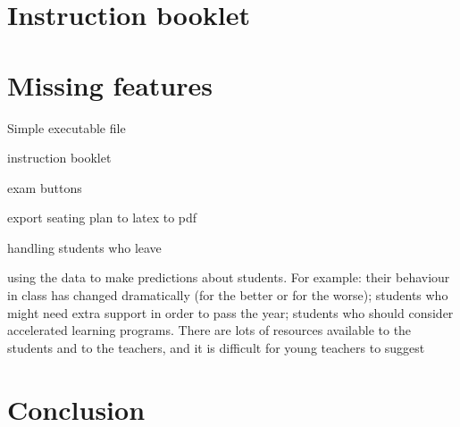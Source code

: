 \documentclass[10pt]{article}
\begin{document}
\section{Instruction booklet} \label{instructions}

\section{Missing features} \label{notdone}

Simple executable file

instruction booklet

exam buttons

export seating plan to latex to pdf

handling students who leave

using the data to make predictions about students. For example: their behaviour in class has changed dramatically (for the better or for the worse); students who might need extra support in order to pass the year; students who should consider accelerated learning programs. There are lots of resources available to the students and to the teachers, and it is difficult for young teachers to suggest



\section{Conclusion}
\end{document}
